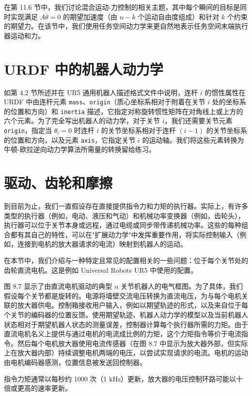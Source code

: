 \documentclass[12pt,a4paper]{article}
\begin{document}
在第 11.6 节中，我们讨论混合运动-力控制的相关主题，其中每个瞬间的目标是同时实现满足 $A\ddot{\theta} = 0$ 的期望加速度（由 $n-k$ 个运动自由度组成）和针对 $k$ 个约束的期望力。在该节中，我们使用任务空间动力学来更自然地表示任务空间末端执行器运动和力。

\section{URDF 中的机器人动力学}
如第 4.2 节所述并在 UR5 通用机器人描述格式文件中说明，连杆 $i$ 的惯性属性在 URDF 中由连杆元素 \texttt{mass}、\texttt{origin}（质心坐标系相对于附着在关节 $i$ 处的坐标系的位置和方向）和 \texttt{inertia} 描述，它指定对称旋转惯性矩阵在对角线上或上方的六个元素。为了完全写出机器人的动力学，对于关节 $i$，我们还需要关节元素 \texttt{origin}，指定当 $\theta_i = 0$ 时连杆 $i$ 的关节坐标系相对于连杆 $(i-1)$ 的关节坐标系的位置和方向，以及元素 \texttt{axis}，它指定关节 $i$ 的运动轴。我们将这些元素转换为牛顿-欧拉逆向动力学算法所需量的转换留给练习。

\section{驱动、齿轮和摩擦}
到目前为止，我们一直假设存在直接提供指令力和力矩的执行器。实际上，有许多类型的执行器（例如，电动、液压和气动）和机械功率变换器（例如，齿轮头），执行器可以位于关节本身或远程，通过电缆或同步带传递机械功率。这些的每种组合都有其自己的特性，可以在"扩展动力学"中发挥重要作用，将实际控制输入（例如，连接到电机的放大器请求的电流）映射到机器人的运动。

在本节中，我们介绍与一种特定且常见的配置相关的一些问题：位于每个关节处的齿轮直流电机。这是例如 Universal Robots UR5 中使用的配置。

图 8.7 显示了由直流电机驱动的典型 $n$ 关节机器人的电气框图。为了具体，我们假设每个关节都是旋转的。电源将墙壁交流电压转换为直流电压，为与每个电机关联的放大器供电。控制箱接收用户输入，例如以期望轨迹的形式，以及来自位于每个关节的编码器的位置反馈。使用期望轨迹、机器人动力学的模型以及当前机器人状态相对于期望机器人状态的测量误差，控制器计算每个执行器所需的力矩。由于直流电机名义上提供与通过电机的电流成比例的力矩，这个力矩指令等价于电流指令。然后每个电机放大器使用电流传感器（在图 8.7 中显示为放大器外部，但实际上在放大器内部）持续调整电机两端的电压，以尝试实现请求的电流。电机的运动由电机编码器感测，位置信息被发送回控制器。

指令力矩通常以每秒约 1000 次（1 kHz）更新，放大器的电压控制环路可能以十倍或更高的速率更新。
\end{document}
